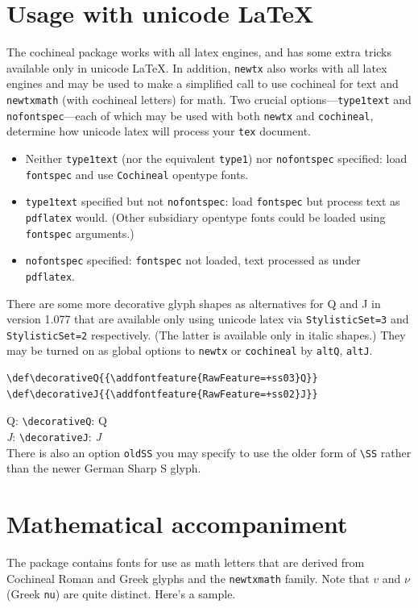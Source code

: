 \documentclass[11pt]{article}
\begin{document}
\section*{Usage with unicode LaTeX}
The cochineal package works with all latex engines, and has some extra tricks available only in unicode LaTeX. In addition, {\tt newtx} also works with all latex engines and may be used to make a simplified call to use cochineal for text and {\tt newtxmath} (with cochineal letters) for math. Two crucial options---{\tt type1text} and {\tt nofontspec}---each of which may be used with both {\tt newtx} and {\tt cochineal}, determine how unicode latex will process your {\tt tex} document.
\begin{itemize}
\item
Neither {\tt type1text} (nor the equivalent {\tt type1}) nor {\tt nofontspec} specified: load {\tt fontspec} and use {\tt Cochineal} opentype fonts.
\item {\tt type1text} specified but not {\tt nofontspec}: load {\tt fontspec} but process text as {\tt pdflatex} would. (Other subsidiary opentype fonts could be loaded using {\tt fontspec} arguments.)
\item {\tt nofontspec} specified: {\tt fontspec} not loaded, text processed as under {\tt pdflatex}.
\end{itemize}
There are some more decorative glyph shapes as alternatives for Q and J in version 1.077 that are available only using unicode latex via {\tt StylisticSet=3} and {\tt StylisticSet=2} respectively. (The latter is available only in italic shapes.) They may be turned on as global options to {\tt newtx} or {\tt cochineal} by {\tt altQ}, {\tt altJ}.

\iftutex
\begin{verbatim}
\def\decorativeQ{{\addfontfeature{RawFeature=+ss03}Q}}
\def\decorativeJ{{\addfontfeature{RawFeature=+ss02}J}}
\end{verbatim}
\def\decorativeQ{{\addfontfeature{RawFeature=+ss03}Q}}
\def\decorativeJ{{\addfontfeature{RawFeature=+ss02}J}}
Q: \verb|\decorativeQ|: \decorativeQ\\
{\itshape J}:  \verb|\decorativeJ|: {\itshape \decorativeJ}\\
\fi
There is also an option {\tt oldSS} you may specify to use the older form of \verb|\SS| rather than the newer German Sharp S glyph.

\section*{Mathematical accompaniment}
The package contains fonts for use as math letters that are derived from Cochineal Roman and Greek glyphs and the {\tt newtxmath} family. Note that $v$ and $\nu$ (Greek {\tt nu}) are quite distinct. Here's a sample.
\end{document}
